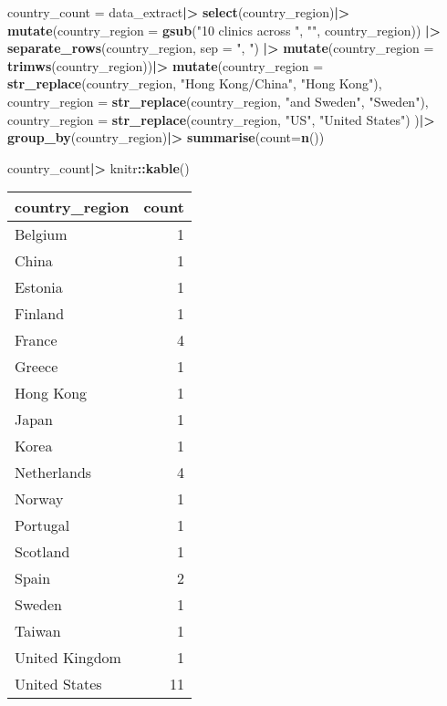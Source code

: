 \documentclass[
]{article}
\newenvironment{Shaded}{\begin{snugshade}}{\end{snugshade}}
\newcommand{\AttributeTok}[1]{\textcolor[rgb]{0.13,0.29,0.53}{#1}}
\newcommand{\FunctionTok}[1]{\textcolor[rgb]{0.13,0.29,0.53}{\textbf{#1}}}
\newcommand{\NormalTok}[1]{#1}
\newcommand{\OtherTok}[1]{\textcolor[rgb]{0.56,0.35,0.01}{#1}}
\newcommand{\SpecialCharTok}[1]{\textcolor[rgb]{0.81,0.36,0.00}{\textbf{#1}}}
\newcommand{\StringTok}[1]{\textcolor[rgb]{0.31,0.60,0.02}{#1}}
\begin{document}
\begin{Shaded}
\begin{Highlighting}[]
\NormalTok{country\_count }\OtherTok{=}
\NormalTok{data\_extract}\SpecialCharTok{|\textgreater{}}
  \FunctionTok{select}\NormalTok{(country\_region)}\SpecialCharTok{|\textgreater{}}
  \FunctionTok{mutate}\NormalTok{(}\AttributeTok{country\_region =} \FunctionTok{gsub}\NormalTok{(}\StringTok{"10 clinics across "}\NormalTok{, }\StringTok{""}\NormalTok{, country\_region)) }\SpecialCharTok{|\textgreater{}}
  \FunctionTok{separate\_rows}\NormalTok{(country\_region, }\AttributeTok{sep =} \StringTok{", "}\NormalTok{) }\SpecialCharTok{|\textgreater{}}
  \FunctionTok{mutate}\NormalTok{(}\AttributeTok{country\_region =} \FunctionTok{trimws}\NormalTok{(country\_region))}\SpecialCharTok{|\textgreater{}}
  \FunctionTok{mutate}\NormalTok{(}\AttributeTok{country\_region =} \FunctionTok{str\_replace}\NormalTok{(country\_region, }\StringTok{"Hong Kong/China"}\NormalTok{, }\StringTok{"Hong Kong"}\NormalTok{),}
         \AttributeTok{country\_region =} \FunctionTok{str\_replace}\NormalTok{(country\_region, }\StringTok{"and Sweden"}\NormalTok{, }\StringTok{"Sweden"}\NormalTok{),}
         \AttributeTok{country\_region =} \FunctionTok{str\_replace}\NormalTok{(country\_region, }\StringTok{"US"}\NormalTok{, }\StringTok{"United States"}\NormalTok{)}
\NormalTok{         )}\SpecialCharTok{|\textgreater{}}
  \FunctionTok{group\_by}\NormalTok{(country\_region)}\SpecialCharTok{|\textgreater{}}
  \FunctionTok{summarise}\NormalTok{(}\AttributeTok{count=}\FunctionTok{n}\NormalTok{())}

\NormalTok{country\_count}\SpecialCharTok{|\textgreater{}}
\NormalTok{  knitr}\SpecialCharTok{::}\FunctionTok{kable}\NormalTok{()}
\end{Highlighting}
\end{Shaded}

\begin{longtable}[]{@{}lr@{}}
\toprule\noalign{}
country\_region & count \\
\midrule\noalign{}
\endhead
\bottomrule\noalign{}
\endlastfoot
Belgium & 1 \\
China & 1 \\
Estonia & 1 \\
Finland & 1 \\
France & 4 \\
Greece & 1 \\
Hong Kong & 1 \\
Japan & 1 \\
Korea & 1 \\
Netherlands & 4 \\
Norway & 1 \\
Portugal & 1 \\
Scotland & 1 \\
Spain & 2 \\
Sweden & 1 \\
Taiwan & 1 \\
United Kingdom & 1 \\
United States & 11 \\
\end{longtable}
\end{document}
